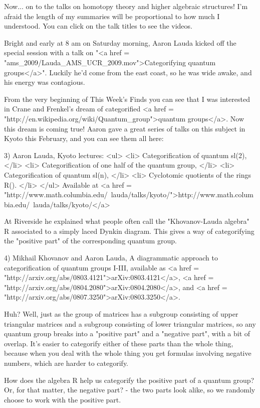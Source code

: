 Now... on to the talks on homotopy theory and higher algebraic
structures!  I'm afraid the length of my summaries will be
proportional to how much I understood.  You can click on the talk
titles to see the videos.

Bright and early at 8 am on Saturday morning, Aaron Lauda kicked off
the special session with a talk on "<a href =
"ams_2009/Lauda_AMS_UCR_2009.mov">Categorifying quantum
groups</a>".  Luckily he'd come from the east coast, so he was
wide awake, and his energy was contagious.

From the very beginning of This Week's Finds you can see that I was
interested in Crane and Frenkel's dream of categorified <a href =
"http://en.wikipedia.org/wiki/Quantum_group">quantum groups</a>.  Now
this dream is coming true!  Aaron gave a great series of talks on this
subject in Kyoto this February, and you can see them all here:

3) Aaron Lauda, Kyoto lectures: 
<ul>
<li>
Categorification of quantum sl(2),
</li>
<li>
Categorification of one half of the quantum group, 
</li>
<li>
Categorification of quantum sl(n),
</li>
<li>
Cyclotomic quotients of the rings R(\nu ).
</li>
</ul>
Available at <a href = "http://www.math.columbia.edu/~lauda/talks/kyoto/">http://www.math.columbia.edu/~lauda/talks/kyoto/</a>

At Riverside he explained what people often call the "Khovanov-Lauda
algebra" R associated to a simply laced Dynkin diagram.  This gives a
way of categorifying the "positive part" of the corresponding quantum
group.  

4) Mikhail Khovanov and Aaron Lauda, A diagrammatic approach to 
categorification of quantum groups I-III, available as
<a href = "http://arxiv.org/abs/0803.4121">arXiv:0803.4121</a>,
<a href = "http://arxiv.org/abs/0804.2080">arXiv:0804.2080</a>,
and
<a href = "http://arxiv.org/abs/0807.3250">arXiv:0803.3250</a>.

Huh?  Well, just as the group of matrices has a subgroup consisting of
upper triangular matrices and a subgroup consisting of lower
triangular matrices, so any quantum group breaks into a "positive
part" and a "negative part", with a bit of overlap.
It's easier to categorify either of these parts than the whole thing,
because when you deal with the whole thing you get formulas involving
negative numbers, which are harder to categorify.

How does the algebra R help us categorify the positive part of a
quantum group?  Or, for that matter, the negative part? - the two
parts look alike, so we randomly choose to work with the positive
part.  

